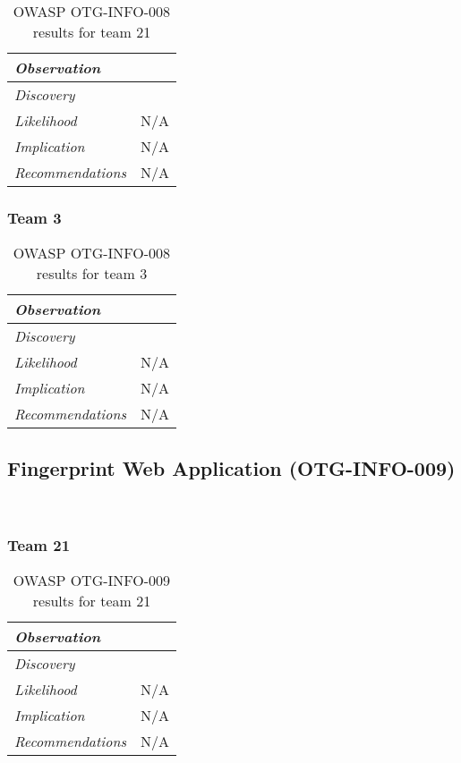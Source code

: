 \documentclass[headsepline,footsepline,footinclude=false,oneside,fontsize=11pt,paper=a4,listof=totoc,bibliography=totoc]{scrbook} %
\begin{document}
\begin{table}[H]
\centering
 \begin{tabular}{l p{11cm}} 
 \textit{Observation} & \\ 
 \hline
 \textit{Discovery} &  \\
 \hline
 \textit{Likelihood} & N/A\\
 \hline
 \textit{Implication} & N/A\\
 \hline
 \textit{Recommendations} & N/A\\ 
\end{tabular}
\caption{OWASP OTG-INFO-008 results for team 21}
\label{table:scenario2}
\end{table}

\subsubsection{Team 3}

\begin{table}[H]
\centering
 \begin{tabular}{l p{11cm}} 
 \textit{Observation} & \\ 
 \hline
 \textit{Discovery} &  \\
 \hline
 \textit{Likelihood} & N/A\\
 \hline
 \textit{Implication} & N/A\\
 \hline
 \textit{Recommendations} & N/A\\ 
\end{tabular}
\caption{OWASP OTG-INFO-008 results for team 3}
\label{table:scenario2}
\end{table}

\pagebreak 

\subsection{Fingerprint Web Application (OTG-INFO-009)}\

\subsubsection{Team 21}

\begin{table}[H]
\centering
 \begin{tabular}{l p{11cm}} 
 \textit{Observation} & \\ 
 \hline
 \textit{Discovery} &  \\
 \hline
 \textit{Likelihood} & N/A\\
 \hline
 \textit{Implication} & N/A\\
 \hline
 \textit{Recommendations} & N/A\\ 
\end{tabular}
\caption{OWASP OTG-INFO-009 results for team 21}
\label{table:scenario2}
\end{table}
\end{document}
